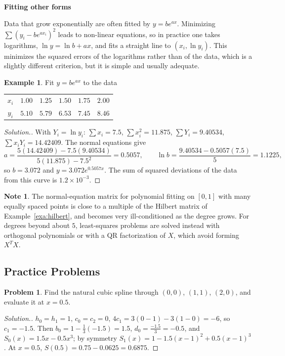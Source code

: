 \documentclass[11pt,a4paper]{article}
\numberwithin{equation}{section}
\theoremstyle{definition}
\newtheorem{exa}[thm]{Example}
\newtheorem*{note}{Note}
\newtheorem{problemx}{Problem}[subsection]
\newenvironment{problem}{\begin{problemx}}{\end{problemx}}
\newenvironment{solution}
  {\renewcommand{\qedsymbol}{}\begin{proof}[\textit{Solution}.]}
  {\end{proof}}
\newcommand{\subhead}[1]{%
  \par\medskip\noindent\textbf{#1}\par\nobreak\smallskip}
\begin{document}
\subhead{Fitting other forms}
Data that grow exponentially are often fitted by $y = be^{ax}$. Minimizing $\sum(y_i-be^{ax_i})^2$ leads to non-linear equations, so in practice
one takes logarithms, $\ln y = \ln b+ax$, and fits a straight line to $(x_i,\ln y_i)$. This minimizes the squared errors of the logarithms
rather than of the data, which is a slightly different criterion, but it is simple and usually adequate.

\begin{exa}
\label{exa:lsexp}
Fit $y = be^{ax}$ to the data
\begin{center}
\begin{tabular}{cccccc}
\hline
$x_i$ & $1.00$ & $1.25$ & $1.50$ & $1.75$ & $2.00$\\
$y_i$ & $5.10$ & $5.79$ & $6.53$ & $7.45$ & $8.46$\\
\hline
\end{tabular}
\end{center}
\end{exa}

\begin{solution}
With $Y_i = \ln y_i$: $\sum x_i = 7.5$, $\sum x_i^2 = 11.875$, $\sum Y_i = 9.40534$, $\sum x_iY_i = 14.42409$. The normal equations give
$$a = \frac{5(14.42409)-7.5(9.40534)}{5(11.875)-7.5^2} = 0.5057,\qquad\ln b = \frac{9.40534-0.5057(7.5)}{5} = 1.1225,$$
so $b = 3.072$ and $y = 3.072e^{0.5057x}$. The sum of squared deviations of the data from this curve is $1.2\times10^{-3}$.
\end{solution}

\begin{note}
The normal-equation matrix for polynomial fitting on $[0,1]$ with many equally spaced points is close to a multiple of the Hilbert matrix
of Example~\ref{exa:hilbert}, and becomes very ill-conditioned as the degree grows. For degrees beyond about $5$, least-squares problems are
solved instead with orthogonal polynomials or with a QR factorization of $X$, which avoid forming $X^TX$.
\end{note}


\subsection{Practice Problems}

\begin{problem}
Find the natural cubic spline through $(0,0)$, $(1,1)$, $(2,0)$, and evaluate it at $x = 0.5$.
\end{problem}
\begin{solution}
$h_0 = h_1 = 1$, $c_0 = c_2 = 0$, $4c_1 = 3(0-1)-3(1-0) = -6$, so $c_1 = -1.5$. Then $b_0 = 1-\frac13(-1.5) = 1.5$, $d_0 = \frac{-1.5}{3} = -0.5$, and
$S_0(x) = 1.5x-0.5x^3$; by symmetry $S_1(x) = 1-1.5(x-1)^2+0.5(x-1)^3$. At $x = 0.5$, $S(0.5) = 0.75-0.0625 = 0.6875$.
\end{solution}
\end{document}
